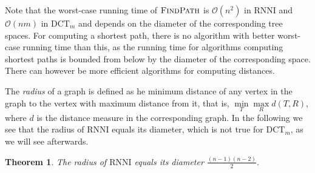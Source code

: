 \documentclass[11pt]{amsart}
\newtheorem{theorem}{Theorem}
\newcommand{\rnni}{\mathrm{RNNI}}
\newcommand{\findpath}{\textsc{FindPath}}
\newcommand{\dtt}{\mathrm{DCT}}
\renewcommand{\O}{\mathcal O}
\newcommand{\summary}[1]{} %
\begin{document}
Note that the worst-case running time of $\findpath$ is $\O(n^2)$ in $\rnni$ and $\O(nm)$ in $\dtt_m$ and depends on the diameter of the corresponding tree spaces.
For computing a shortest path, there is no algorithm with better worst-case running time than this, as the running time for algorithms computing shortest paths is bounded from below by the diameter of the corresponding space.
There can however be more efficient algorithms for computing distances.

\summary{Radius of $\rnni$ is equal to its diameter.}
The \emph{radius} of a graph is defined as he minimum distance of any vertex in the graph to the vertex with maximum distance from it, that is, $\min\limits_{T}\max\limits_{R} d(T,R)$, where $d$ is the distance measure in the corresponding graph.
In the following we see that the radius of $\rnni$ equals its diameter, which is not true for $\dtt_m$, as we will see afterwards.

\begin{theorem}
	The radius of $\rnni$ equals its diameter $\frac{(n-1)(n-2)}{2}$.
	\label{thm:radius_rnni}
\end{theorem}
\end{document}
